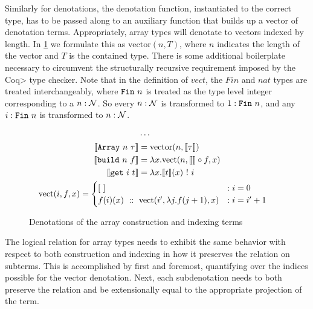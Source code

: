   Similarly for denotations, the denotation function, instantiated to the correct type, has to be passed along to an auxiliary function that builds up a vector of denotation terms.
  Appropriately, array types will denotate to vectors indexed by length.
  In \cref{fig:denotation_array} we formulate this as $\text{vector}(n, T)$, where $n$ indicates the length of the vector and $T$ is the contained type.
  There is some additional boilerplate necessary to circumvent the structurally recursive requirement imposed by the \<Coq> type checker.
  Note that in the definition of $vect$, the $Fin$ and $nat$ types are treated interchangeably, where $\texttt{Fin}\ n$ is treated as the type level integer corresponding to a $n : \mathcal{N}$.
  So every $n : \mathcal{N}$ is transformed to $1 : \texttt{Fin}\ n$, and any $i : \texttt{Fin}\ n$ is transformed to $n : \mathcal{N}$.

  \begin{figure}
    \begin{gather*}
      \begin{aligned}
        &\cdots \\
        \llbracket \texttt{Array}\ n\ \tau \rrbracket &=
          \text{vector}(n, \llbracket \tau \rrbracket) \\
        \llbracket \texttt{build}\ n\ f \rrbracket &=
          \lambda x.
          \text{vect}(n, \llbracket \rrbracket \circ f, x) \\
        \llbracket \texttt{get}\ i\ t \rrbracket &=
          \lambda x. \llbracket t \rrbracket(x)\ !\ i \\
      \end{aligned} \\
      \begin{aligned}
      \text{vect}(i, f, x) &=
        \begin{cases}
          [\ ]
            &: i = 0 \\
          f(i)(x)\ ::\ \text{vect}(i', \lambda j. f(j + 1), x)
            &: i = i' + 1
        \end{cases}
      \end{aligned}
    \end{gather*}
    \caption{Denotations of the array construction and indexing terms}
    \label{fig:denotation_array}
  \end{figure}

  The logical relation for array types needs to exhibit the same behavior with respect to both construction and indexing in how it preserves the relation on subterms.
  This is accomplished by first and foremost, quantifying over the indices possible for the vector denotation.
  Next, each subdenotation needs to both preserve the relation and be extensionally equal to the appropriate projection of the term.

